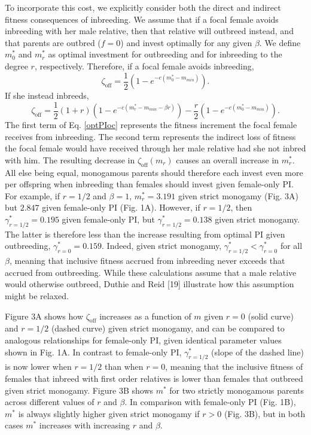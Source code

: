 \documentclass[12pt]{article}
\begin{document}
To incorporate this cost, we explicitly consider both the direct and indirect fitness consequences of inbreeding. We assume that if a focal female avoids inbreeding with her male relative, then that relative will outbreed instead, and that parents are outbred ($f=0$) and invest optimally for any given $\beta$. We define $m^{*}_{0}$ and $m^{*}_{r}$ as optimal investment for outbreeding and for inbreeding to the degree $r$, respectively. Therefore, if a focal female avoids inbreeding,
\begin{equation} \label{optPI}
\zeta_{\textrm{off}} = \frac{1}{2}\left(1-e^{-c\left(m^{*}_{0}-m_{min}\right)}\right).
\end{equation}
If she instead inbreeds,
\begin{equation} \label{optPIoc}
\zeta_{\textrm{off}} = \frac{1}{2}\left(1+r\right)\left(1-e^{-c\left(m^{*}_{r}-m_{min}-\beta r\right)}\right) - \frac{r}{2}\left(1-e^{-c\left(m^{*}_{0}-m_{min}\right)}\right).
\end{equation} 
The first term of Eq. \ref{optPIoc} represents the fitness increment the focal female receives from inbreeding. The second term represents the indirect loss of fitness the focal female would have received through her male relative had she not inbred with him. The resulting decrease in $\zeta_{\textrm{off}}(m_{r})$ causes an overall increase in $m^{*}_{r}$. All else being equal, monogamous parents should therefore each invest even more per offspring when inbreeding than females should invest given female-only PI. For example, if $r=1/2$ and $\beta=1$, $m^{*}_{r}= 3.191$ given strict monogamy (Fig. 3A) but $2.847$ given female-only PI (Fig. 1A). However, if $r=1/2$, then $\gamma^{*}_{r=1/2}=0.195$ given female-only PI, but $\gamma^{*}_{r=1/2}=0.138$ given strict monogamy. The latter is therefore less than the increase resulting from optimal PI given outbreeding, $\gamma^{*}_{r=0}=0.159$. Indeed, given strict monogamy, $\gamma^{*}_{r=1/2} < \gamma^{*}_{r=0}$ for all $\beta$, meaning that inclusive fitness accrued from inbreeding never exceeds that accrued from outbreeding.  While these calculations assume that a male relative would otherwise outbreed, Duthie and Reid [19] illustrate how this assumption might be relaxed.

Figure 3A shows how $\zeta_{\textrm{off}}$ increases as a function of $m$ given $r=0$ (solid curve) and $r=1/2$ (dashed curve) given strict monogamy, and can be compared to analogous relationships for female-only PI, given identical parameter values shown in Fig. 1A. In contrast to female-only PI, $\gamma^{*}_{r=1/2}$ (slope of the dashed line) is now lower when $r=1/2$ than when $r=0$, meaning that the inclusive fitness of females that inbreed with first order relatives is lower than females that outbreed given strict monogamy. Figure 3B shows $m^{*}$ for two strictly monogamous parents across different values of $r$ and $\beta$. In comparison with female-only PI (Fig. 1B), $m^{*}$ is always slightly higher given strict monogamy if $r>0$ (Fig. 3B), but in both cases $m^{*}$ increases with increasing $r$ and $\beta$. 
\end{document}
